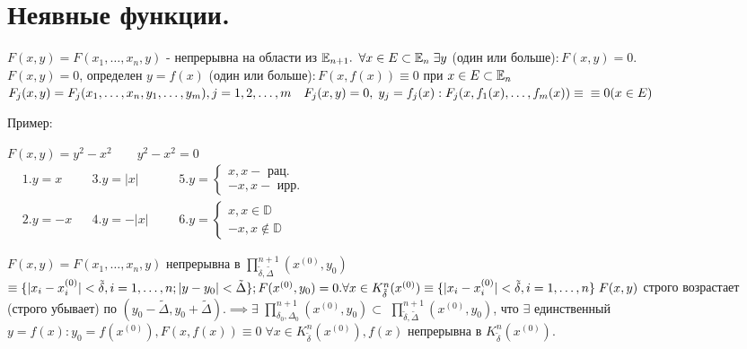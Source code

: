 \documentclass[../main.tex]{subfiles}
\begin{document}
\section{Неявные функции.}
\noindent $F(x,y) = F(x_{1},\dots,x_{n},y)$ - непрерывна на области из $\mathbb{E}_{n+1}.$ $\forall x \in E \subset \mathbb{E}_{n} \; \exists y $ (один или больше)$: F(x,y)=0$. 
\\$F(x,y) = 0 $, определен $y=f(x)$ (один или больше)$: F(x,f(x))\equiv 0 $ при $x\in E\subset \mathbb{E}_{n}$
\\$F_{j}(x,y)=F_{j}(x_{1},\dots,x_{n},y_{1},\dots,y_{m}), j =1,2,\dots,m\quad F_{j}(x,y) = 0, \; y_{j}=f_{j}(x):F_{j}(x,f_{1}(x),\dots,f_{m}(x))\equiv\\ \equiv 0 (x\in E)$
 
Пример:

\noindent $F(x,y) = y^{2}-x^{2} \qquad y^{2}-x^{2}=0$\\
$\begin{aligned} 
&1. y=x
&&3. y= |x|  
&&&5.y= \begin{cases}
    x, x - \text{ рац.} \\ 
    -x, x - \text{ ирр.}
\end{cases}\\
&2. y=-x
&&4. y=-|x|
&&&6. y = \begin{cases}
     x, x \in \mathbb{D} \\ 
     -x , x \notin \mathbb{D}
\end{cases} 
\end{aligned}$\\

\begin{theorem}
    $F(x,y) = F(x_{1},\dots,x_{n},y)$ непрерывна в $\textstyle \prod_{\tilde{\delta},\tilde{\Delta}}^{n+1}(x^{(0)},y_{0})$ $\equiv \{|x_{i}-x_{i}^{(0)}|<\tilde{\delta}, i=1,\dots,n;\\ |y-y_{0}| < \tilde{\Delta}\}; F(x^{(0)},y_{0})= 0. \forall x \in K_{\tilde{\delta}}^{n}(x^{(0)}) \equiv \{ |x_{i}-x_{i}^{(0)}|<\tilde{\delta}, i=1,\dots,n\}\; F(x,y)$ строго возрастает (строго убывает) по $(y_{0}-\tilde{\Delta},y_{0}+\tilde{\Delta}). \implies \exists$ $\textstyle \prod_{\delta_{0},\Delta_{0}}^{n+1}(x^{(0)},y_{0})$$\subset$ $\textstyle \prod_{\tilde{\delta},\tilde{\Delta}}^{n+1}(x^{(0)},y_{0})$, что $\exists$ единственный $y= f(x): y_{0} =f(x^{(0)}), F(x,f(x))\equiv 0 \; \forall x \in K_{\tilde{\delta}}^{n}(x^{(0)}), f(x)$ непрерывна в $K_{\tilde{\delta}}^{n}(x^{(0)})$.
\end{theorem}
\end{document}
